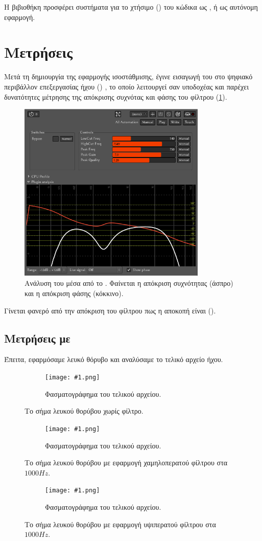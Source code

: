 \documentclass[12pt]{extarticle}
\newcommand{\filterspectrums}[2]
{
\begin{figure}
     \centering
     \begin{subfigure}[b]{\textwidth}
         \centering
         \texttt{[image: \#1.png]}
         \caption{Φασματογράφημα του τελικού αρχείου.}
     \end{subfigure}
     \hfill
     \hfill
        \caption{#2}
\end{figure}
}
\begin{document}
Η βιβιοθήκη  προσφέρει συστήματα για το χτήσιμο () του κώδικα 
ως  \cite{VSTWiki}, ή ως αυτόνομη εφαρμογή.  

\section{Μετρήσεις}

Μετά τη δημιουργία της εφαρμογής ισοστάθμισης, έγινε εισαγωγή του  
 στο ψηφιακό περιβάλλον επεξεργασίας ήχου () , 
το οποίο λειτουργεί σαν υποδοχέας και παρέχει δυνατότητες μέτρησης της απόκρισης συχνότας και 
φάσης του φίλτρου (\cref{fig:ardour_analysis}).

\begin{figure}[!h]
    \centering
    \includegraphics[width=0.8\textwidth]{./assets/PluginAnalysisArdour.png}
    \caption{Ανάλυση του  μέσα από το . Φαίνεται η απόκριση συχνότητας (άσπρο) και η απόκριση φάσης (κόκκινο).}
    \label{fig:ardour_analysis}
\end{figure}

Γίνεται φανερό από την απόκριση του φίλτρου πως η αποκοπή 
είναι  (). 

\subsection{Μετρήσεις με }
Έπειτα, εφαρμόσαμε λευκό θόρυβο και αναλύσαμε το τελικό αρχείο ήχου.

\filterspectrums{./assets/WhiteNoise}{Το σήμα λευκού θορύβου χωρίς φίλτρο.}
\filterspectrums{./assets/WhiteNoiseLP}{Το σήμα λευκού θορύβου με εφαρμογή χαμηλοπερατού φίλτρου στα $1000Hz$.}
\filterspectrums{./assets/WhiteNoiseHP}{Το σήμα λευκού θορύβου με εφαρμογή υψιπερατού φίλτρου στα $1000Hz$.}
\end{document}

